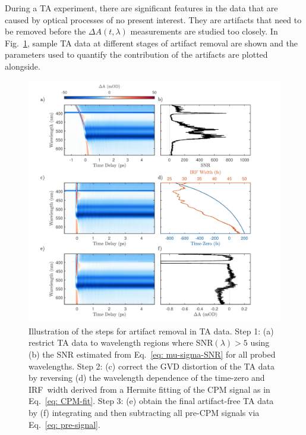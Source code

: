 During a TA experiment, there are significant features
in the data that are caused by optical processes of no present interest. They are artifacts
that need to be removed before the $\Delta A(t, \lambda)$ measurements are studied too closely.
In Fig.~\ref{fig: TA-Clean}, sample TA data at different stages of artifact removal
are shown and the parameters used to quantify the contribution of the artifacts are plotted alongside.
%
\begin{figure}[t!]
  \centering
  \includegraphics[width = \textwidth]{Figures/fig_TA_cleanup.pdf}
  \caption[Illustration of the steps for artifact removal in TA data.]{
  Illustration of the steps for artifact removal in TA data.
  Step 1: (a) restrict TA data to wavelength regions where $\textrm{SNR}(\lambda) > 5$
  using (b) the SNR estimated from Eq.~\eqref{eq: mu-sigma-SNR} for all probed wavelengths.
  Step 2: (c) correct the GVD distortion of the TA data
  by reversing (d) the wavelength dependence of the time-zero and IRF~width
  derived from a Hermite fitting of the CPM signal as in Eq.~\eqref{eq: CPM-fit}.
  Step 3: (e) obtain the final artifact-free TA data by
  (f) integrating and then subtracting all pre-CPM signals via Eq.~\eqref{eq: pre-signal}.
  }
  \label{fig: TA-Clean}
\end{figure}


